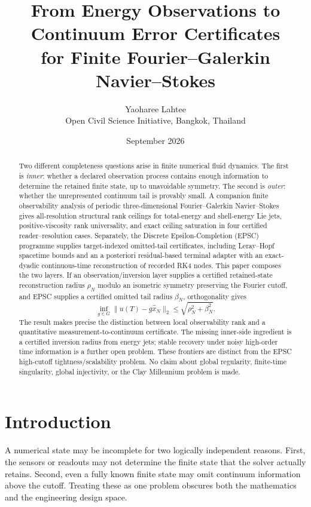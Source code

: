 \documentclass[11pt]{article}
\title{From Energy Observations to Continuum Error Certificates\\
for Finite Fourier--Galerkin Navier--Stokes}
\author{Yaoharee Lahtee\\
\small Open Civil Science Initiative, Bangkok, Thailand}
\date{September 2026}
\theoremstyle{definition}
\begin{document}
\maketitle

\begin{abstract}
Two different completeness questions arise in finite numerical fluid dynamics.  The first is
\emph{inner}: whether a declared observation process contains enough information to determine the
retained finite state, up to unavoidable symmetry.  The second is \emph{outer}: whether the
unrepresented continuum tail is provably small.  A companion finite observability analysis of
periodic three-dimensional Fourier--Galerkin Navier--Stokes gives all-resolution structural rank
ceilings for total-energy and shell-energy Lie jets, positive-viscosity rank universality, and exact
ceiling saturation in four certified reader--resolution cases.  Separately, the Discrete
Epsilon-Completion (EPSC) programme supplies target-indexed omitted-tail certificates, including
Leray--Hopf spacetime bounds and an a posteriori residual-based terminal adapter with an exact-dyadic
continuous-time reconstruction of recorded RK4 nodes.  This paper composes the two layers.  If an
observation/inversion layer supplies a certified retained-state reconstruction radius $\rho_N$
modulo an isometric symmetry preserving the Fourier cutoff, and EPSC supplies a certified omitted
tail radius $\beta_N$, orthogonality gives
\[
\inf_{g\in G}\|u(T)-g\widehat x_N\|_2
\le \sqrt{\rho_N^2+\beta_N^2}.
\]
The result makes precise the distinction between local observability rank and a quantitative
measurement-to-continuum certificate.  The missing inner-side ingredient is a certified inversion
radius from energy jets; stable recovery under noisy high-order time information is a further open
problem.  These frontiers are distinct from the EPSC high-cutoff tightness/scalability problem.
No claim about global regularity, finite-time singularity, global injectivity, or the Clay
Millennium problem is made.
\end{abstract}

\section{Introduction}

A numerical state may be incomplete for two logically independent reasons.  First, the sensors or
readouts may not determine the finite state that the solver actually retains.  Second, even a fully
known finite state may omit continuum information above the cutoff.  Treating these as one problem
obscures both the mathematics and the engineering design space.
\end{document}
